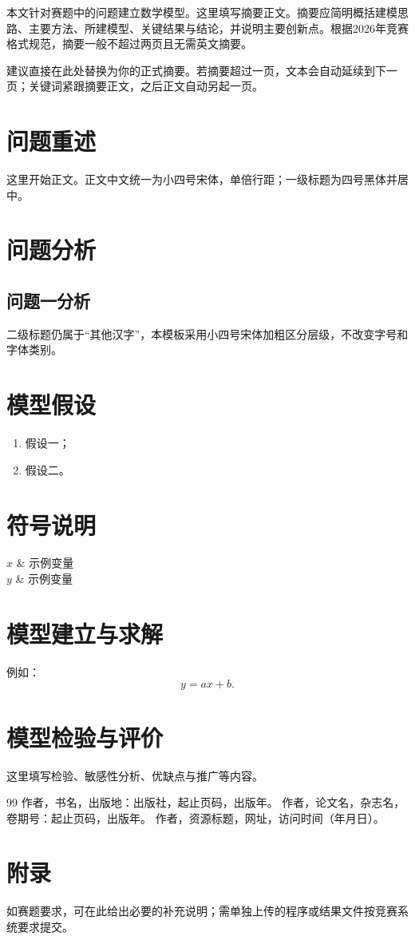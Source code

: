 \documentclass{hwcup2026}
\begin{document}
\makehwcover

\begin{hwabstract}
本文针对赛题中的问题建立数学模型。这里填写摘要正文。摘要应简明概括建模思路、主要方法、所建模型、关键结果与结论，并说明主要创新点。根据2026年竞赛格式规范，摘要一般不超过两页且无需英文摘要。

建议直接在此处替换为你的正式摘要。若摘要超过一页，文本会自动延续到下一页；关键词紧跟摘要正文，之后正文自动另起一页。
\end{hwabstract}

\section{问题重述}
这里开始正文。正文中文统一为小四号宋体，单倍行距；一级标题为四号黑体并居中。

\section{问题分析}
\subsection{问题一分析}
二级标题仍属于“其他汉字”，本模板采用小四号宋体加粗区分层级，不改变字号和字体类别。

\section{模型假设}
\begin{enumerate}
  \item 假设一；
  \item 假设二。
\end{enumerate}

\section{符号说明}
\begin{notation}
$x$ & 示例变量\\
$y$ & 示例变量\\
\end{notation}

\section{模型建立与求解}
例如：
\begin{equation}
  y = ax+b.
\end{equation}

\section{模型检验与评价}
这里填写检验、敏感性分析、优缺点与推广等内容。

\begin{thebibliography}{99}
 作者，书名，出版地：出版社，起止页码，出版年。
 作者，论文名，杂志名，卷期号：起止页码，出版年。
 作者，资源标题，网址，访问时间（年月日）。
\end{thebibliography}

\appendix
\section{附录}
如赛题要求，可在此给出必要的补充说明；需单独上传的程序或结果文件按竞赛系统要求提交。
\end{document}

